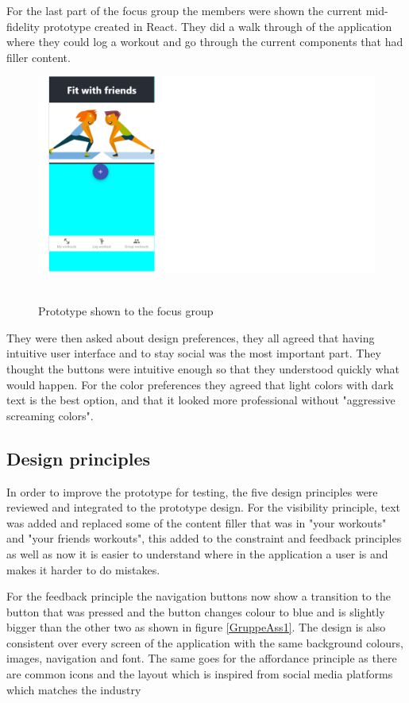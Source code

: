 For the last part of the focus group the members were shown the current mid-fidelity prototype created in React. They did a walk through of the application where they could log a workout and go through the current components that had filler content.
\begin{figure}[H]
\flushright
    \includegraphics[scale=0.6]{figures/appenSaaLangt2.png}
    \
    \caption{Prototype shown to the focus group}
    \label{ReactProt}
\end{figure}

They were then asked about design preferences, they all agreed that having intuitive user interface and to stay social was the most important part. They thought the buttons were intuitive enough so that they understood quickly what would happen.
For the color preferences they agreed that light colors with dark text is the best option, and that it looked more professional without "aggressive screaming colors".
\subsection{Design principles}
In order to improve the prototype for testing, the five design principles were reviewed and integrated to the prototype design. For the visibility principle, text was added and replaced some of the content filler that was in "your workouts" and "your friends workouts", this added to the constraint and feedback principles as well as now it is easier to understand where in the application a user is and makes it harder to do mistakes.

For the feedback principle the navigation buttons now show a transition to the button that was pressed and the button changes colour to blue and is slightly bigger than the other two as shown in figure \ref{GruppeAss1}. The design is also consistent over every screen of the application with the same background colours, images, navigation and font. The same goes for the affordance principle as there are common icons and the layout which is inspired from social media platforms which matches the industry


